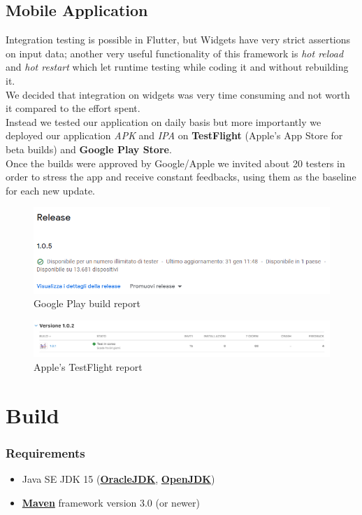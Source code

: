 \documentclass[table, 12pt]{article}
\begin{document}
\subsection{Mobile Application}
Integration testing is possible in Flutter, but Widgets have very strict assertions on input data; another very useful functionality of this framework is \textit{hot reload} and \textit{hot restart} which let runtime testing while coding it and without rebuilding it.\\
We decided that integration on widgets was very time consuming and not worth it compared to the effort spent.\\
Instead we tested our application on daily basis but more importantly we deployed our application \textit{APK} and \textit{IPA} on \textbf{TestFlight} (Apple's App Store for beta builds) and \textbf{Google Play Store}.\\
Once the builds were approved by Google/Apple we invited about 20 testers in order to stress the app and receive constant feedbacks, using them as the baseline for each new update. 
\begin{figure}[H]
    \includegraphics[width=\textwidth]{assets/console.png}
    \caption{Google Play build report}
\end{figure}
\begin{figure}[H]
    \includegraphics[width=\textwidth]{assets/testflight.png}
    \caption{Apple's TestFlight report}
\end{figure}

\section{Build}

\subsubsection{Requirements}
\begin{itemize}
    \item Java SE JDK 15 (\textbf{\href{https://jdk.java.net/15/}{OracleJDK}}, \textbf{\href{https://openjdk.java.net/projects/jdk/15/}{OpenJDK}})
    \item \textbf{\href{https://maven.apache.org/}{Maven}} framework version 3.0 (or newer)
\end{itemize}
\end{document}
